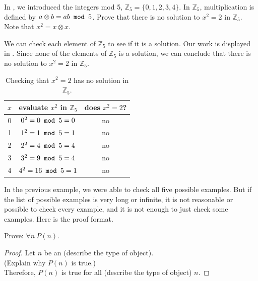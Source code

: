 \begin{exam}
\label{exam_check_every_example}
    In , we introduced the integers mod 5, $\mathbb{Z}_5=\{0,1,2,3,4\}$. In $\mathbb{Z}_5$, 
    multiplication is defined by $a \otimes b = ab \texttt{ mod } 5$.
    Prove that there is no solution to $x^2=2$ in $\mathbb{Z}_5$.  Note that $x^2 = x \otimes x$.
        \begin{soln}
            We can check each element of $\mathbb{Z}_5$ to see if it is a solution. Our work is displayed in . Since none of the elements of $\mathbb{Z}_5$ is a solution, we can conclude that there is no solution to $x^2=2$ in $\mathbb{Z}_5$.
                \begin{table}[hbtp]
                    \centering
                    \begin{tabular}{c|c|c}
                        $x$ & evaluate $x^2$ in $\mathbb{Z}_5$ & does $x^2=2$? \\ \hline
                        0 & $0^2 = 0\texttt{ mod } 5= 0$ & no \\ \hline
                        1 & $1^2 = 1\texttt{ mod } 5= 1$ & no \\ \hline
                        2 & $2^2 = 4\texttt{ mod } 5= 4$ & no \\ \hline
                        3 & $3^2 = 9\texttt{ mod } 5= 4$ & no \\ \hline
                        4 & $4^2 = 16\texttt{ mod } 5= 1$ & no 
                    \end{tabular}
                    \caption{Checking that $x^2=2$ has no solution in $\mathbb{Z}_5$.}
                    \label{tab_dne_sqrt2_mod5}
                \end{table}
        \end{soln}   
\end{exam}

In the previous example, we were able to check all five possible examples.  But if the list of possible examples is very long or infinite, it is not reasonable or possible to check every example, and it is not enough to just check some examples.  Here is the proof format.

\begin{pff}
\label{pff_forall}  
    Prove: $\forall n ~ P(n)$.

    \begin{proof} Let $n$ be an (describe the type of object). \\
    (Explain why $P(n)$ is true.)  \\
    Therefore, $P(n)$ is true for all (describe the type of object) $n$.       
    \end{proof}
\end{pff}

